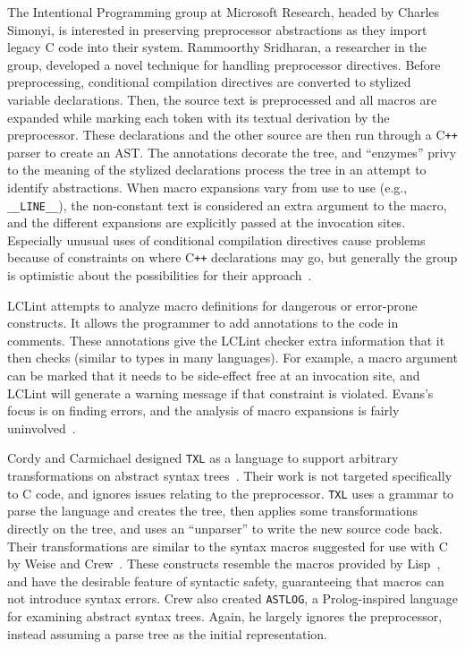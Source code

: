 \documentclass{article}
\newcommand{\CPP}{\mbox{C\texttt{++}}}
\newcommand{\C}{\mbox{C}}
\newcommand{\eg}{e.g.,}
\begin{document}
The Intentional Programming group at Microsoft Research, headed by
Charles Simonyi, is interested in preserving preprocessor abstractions
as they import legacy \C{} code into their system.  Rammoorthy
Sridharan, a researcher in the group, developed a novel technique for
handling preprocessor directives. Before preprocessing, conditional
compilation directives are converted to stylized variable declarations.
Then, the source text is preprocessed and all macros are expanded while
marking each token with its textual derivation by the preprocessor.
These declarations and the other source are then run through a \CPP{}
parser to create an AST.  The annotations decorate the tree, and
``enzymes'' privy to the meaning of the
stylized declarations process the tree in an attempt to identify
abstractions.  When macro expansions vary from use to use (\eg{}
\texttt{\_\_LINE\_\_}), the non-constant text is considered an extra argument
to the macro, and the different expansions are explicitly passed at the invocation
sites. Especially unusual uses of conditional compilation directives
cause problems because of constraints on where \CPP{} declarations may
go, but generally the group is optimistic about the possibilities for
their approach~\cite{MSIPPersonal}.

LCLint attempts to analyze macro definitions for dangerous or
error-prone constructs.  It allows the programmer to add annotations to
the code in comments.  These annotations give the LCLint checker extra
information that it then checks (similar to types in many languages).
For example, a macro argument can be marked that it needs to be
side-effect free at an invocation site, and LCLint will generate a
warning message if that constraint is violated.  Evans's focus is on
finding errors, and the analysis of macro expansions is fairly
uninvolved~\cite[Ch.~8]{LCLint}.

Cordy and Carmichael designed \texttt{TXL} as a language to support
arbitrary transformations on abstract syntax trees~\cite{TXL}.  Their
work is not targeted specifically to \C{} code, and ignores issues
relating to the preprocessor.  \texttt{TXL} uses a grammar to parse the
language and creates the tree, then applies some transformations
directly on the tree, and uses an ``unparser'' to write the new source
code back.  Their transformations are similar to the syntax macros
suggested for use with \C{} by Weise and Crew~\cite{Weise93}.  These
constructs resemble the macros provided by Lisp~\cite{Steele90}, and
have the desirable feature of syntactic safety, guaranteeing that macros can
not introduce syntax errors. Crew also created \texttt{ASTLOG}, a
\textsf{Prolog}-inspired language for examining abstract syntax trees.
Again, he largely ignores the preprocessor, instead assuming a parse
tree as the initial representation.
\end{document}
